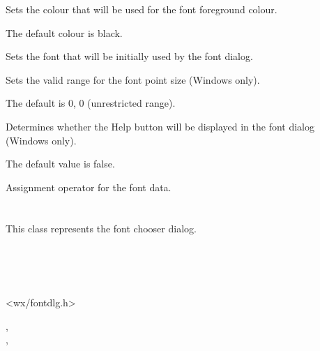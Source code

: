 Sets the colour that will be used for the font foreground colour.

The default colour is black.

\label{wxfontdatasetinitialfont}


Sets the font that will be initially used by the font dialog.

\label{wxfontdatasetrange}


Sets the valid range for the font point size (Windows only).

The default is 0, 0 (unrestricted range).

\label{wxfontdatasetshowhelp}


Determines whether the Help button will be displayed in the font dialog (Windows only).

The default value is false.

\label{wxfontdataassign}


Assignment operator for the font data.

\section{}\label{wxfontdialog}

This class represents the font chooser dialog.


\\
\\
\\


<wx/fontdlg.h>


,\\
,\\

